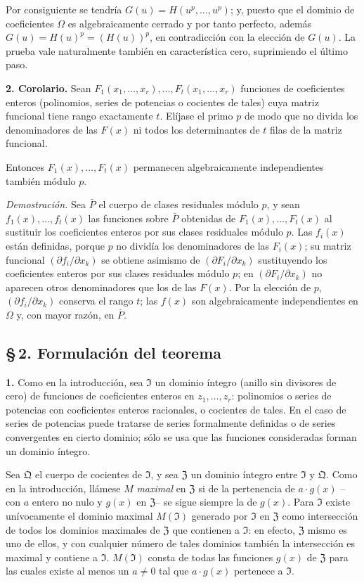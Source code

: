 Por consiguiente se tendría $G(u)=H(u^p,\ldots,u^p)$; y, puesto que el dominio de coeficientes $\Omega$ es algebraicamente cerrado y por tanto perfecto, además $G(u)=H(u)^p=(H(u))^p$, en contradicción con la elección de $G(u)$. La prueba vale naturalmente también en característica cero, suprimiendo el último paso.

\medskip\noindent\textbf{2. Corolario.}
Sean $F_1(x_1,\ldots,x_r),\ldots,F_t(x_1,\ldots,x_r)$ funciones de coeficientes enteros (polinomios, series de potencias o cocientes de tales) cuya matriz funcional tiene rango exactamente $t$. Elíjase el primo $p$ de modo que no divida los denominadores de las $F(x)$ ni todos los determinantes de $t$ filas de la matriz funcional.

Entonces $F_1(x),\ldots,F_t(x)$ permanecen algebraicamente independientes también módulo $p$.

\noindent\emph{Demostración.}
Sea $\bar P$ el cuerpo de clases residuales módulo $p$, y sean $f_1(x),\ldots,f_t(x)$ las funciones sobre $\bar P$ obtenidas de $F_1(x),\ldots,F_t(x)$ al sustituir los coeficientes enteros por sus clases residuales módulo $p$. Las $f_i(x)$ están definidas, porque $p$ no dividía los denominadores de las $F_i(x)$; su matriz funcional $(\partial f_i/\partial x_k)$ se obtiene asimismo de $(\partial F_i/\partial x_k)$ sustituyendo los coeficientes enteros por sus clases residuales módulo $p$; en $(\partial F_i/\partial x_k)$ no aparecen otros denominadores que los de las $F(x)$. Por la elección de $p$, $(\partial f_i/\partial x_k)$ conserva el rango $t$; las $f(x)$ son algebraicamente independientes en $\Omega$ y, con mayor razón, en $\bar P$.

\subsection*{\S\,2. Formulación del teorema}

\noindent\textbf{1.}
Como en la introducción, sea $\mathfrak{I}$ un dominio íntegro (anillo sin divisores de cero) de funciones de coeficientes enteros en $z_1,\ldots,z_r$: polinomios o series de potencias con coeficientes enteros racionales, o cocientes de tales. En el caso de series de potencias puede tratarse de series formalmente definidas o de series convergentes en cierto dominio; sólo se usa que las funciones consideradas forman un dominio íntegro.

Sea $\mathfrak{Q}$ el cuerpo de cocientes de $\mathfrak{I}$, y sea $\mathfrak{Z}$ un dominio íntegro entre $\mathfrak{I}$ y $\mathfrak{Q}$. Como en la introducción, llámese $M$ \emph{maximal} en $\mathfrak{Z}$ si de la pertenencia de $a\cdot g(x)$ --con $a$ entero no nulo y $g(x)$ en $\mathfrak{Z}$-- se sigue siempre la de $g(x)$. Para $\mathfrak{I}$ existe unívocamente el dominio maximal $M(\mathfrak{I})$ generado por $\mathfrak{I}$ en $\mathfrak{Z}$ como intersección de todos los dominios maximales de $\mathfrak{Z}$ que contienen a $\mathfrak{I}$: en efecto, $\mathfrak{Z}$ mismo es uno de ellos, y con cualquier número de tales dominios también la intersección es maximal y contiene a $\mathfrak{I}$. $M(\mathfrak{I})$ consta de todas las funciones $g(x)$ de $\mathfrak{Z}$ para las cuales existe al menos un $a\ne0$ tal que $a\cdot g(x)$ pertenece a $\mathfrak{I}$.

